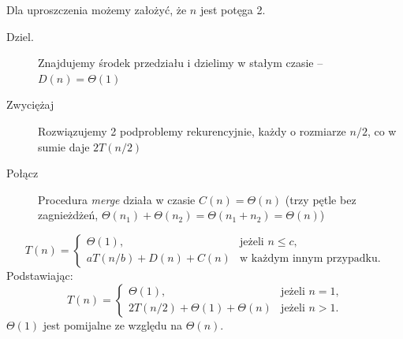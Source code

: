 \documentclass[10pt, oneside]{article}
\theoremstyle{remark}
\begin{document}
Dla uproszczenia możemy założyć, że $n$ jest potęga 2.

\begin{description}
	\item[Dziel.] Znajdujemy środek przedziału i dzielimy w stałym czasie -- $D(n) = \Theta (1)$
	\item[Zwyciężaj] Rozwiązujemy 2 podproblemy rekurencyjnie, każdy o rozmiarze $n/2$, co w sumie daje $2T(n/2)$
	\item[Połącz] Procedura \emph{merge} działa w czasie $C(n)=\Theta(n)$ (trzy pętle bez zagnieżdżeń, $\Theta(n_1) + \Theta(n_2) = \Theta(n_1 + n_2) = \Theta(n)$)
\end{description}

\begin{equation*}
T(n) = \begin{cases}
\Theta(1), &\text{jeżeli $n \leq c $,}\\
aT(n/b) + D(n) + C(n) & \text{w każdym innym przypadku}.
\end{cases}
\end{equation*}
Podstawiając:
\begin{equation*}
T(n) = \begin{cases}
\Theta(1), &\text{jeżeli $n  = 1 $,}\\
2T(n/2) + \Theta(1) + \Theta(n) & \text{jeżeli $n > 1$}.
\end{cases}
\end{equation*}
$\Theta(1)$ jest pomijalne ze względu na $\Theta(n)$.
\end{document}
